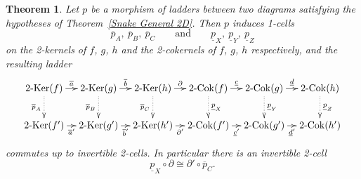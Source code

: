 \documentclass[reqno,a4paper]{amsart}
\numberwithin{equation}{section}
\theoremstyle{plain}
\newtheorem{theorem}[subsection]{Theorem}
\theoremstyle{definition}
\def\nameit#1{\textrm{#1}~}
\def\thex{\nameit{Theorem}}
\newcommand{\comp}{\circ}
\newcommand{\iso}{\cong}
\newcommand{\ov}[1]{\overline{#1}}
\renewcommand{\1}{\onecat{1}}
\newcommand{\TwoKer}{\ensuremath{2\text{-}\mathrm{Ker}}}
\newcommand{\TwoCoker}{\ensuremath{2\text{-}\mathrm{Cok}}}
\begin{document}
\begin{theorem}\label{T:NaturalSnake}
	Let \(p\) be a morphism of ladders between two diagrams satisfying the hypotheses of \thex\ref{Snake General 2D}. Then \(p\) induces 1-cells
	\[
		\ov{p}_A,\ \ov{p}_B,\ \ov{p}_C
		\qquad\text{and}\qquad
		\underline{p}_X,\ \underline{p}_Y,\ \underline{p}_Z
	\]
	on the 2-kernels of \(f\), \(g\), \(h\) and the 2-cokernels of \(f\), \(g\), \(h\) respectively, and the resulting ladder
	\begin{equation*}
		\xymatrix@R=5ex@C=0.9em{
		\TwoKer({f}) \ar@{.>}[d]_-{\ov{p}_A} \ar[r]^-{\ov{a}} &
		\TwoKer({g}) \ar@{.>}[d]_-{\ov{p}_B} \ar[r]^-{\ov{b}} &
		\TwoKer({h}) \ar@{.>}[d]_-{\ov{p}_C} \ar[r]^-{\partial} &
		\TwoCoker({f})\ar@{.>}[d]^-{\underline{p}_X} \ar[r]^-{\underline{c}} &
		\TwoCoker({g}) \ar@{.>}[d]^-{\underline{p}_Y} \ar[r]^-{\underline{d}} &
		\TwoCoker({h}) \ar@{.>}[d]^-{\underline{p}_Z}\\
		\TwoKer({f}') \ar[r]_-{\ov{a}'} &
		\TwoKer({g}') \ar[r]_-{\ov{b}'} &
		\TwoKer({h}') \ar[r]_-{\partial'} &
		\TwoCoker({f}') \ar[r]_-{\underline{c}'} &
		\TwoCoker({g}') \ar[r]_-{\underline{d}'} &
		\TwoCoker({h}')
		}
	\end{equation*}
	commutes up to invertible 2-cells. In particular there is an invertible 2-cell
	\[
		\underline{p}_X\comp\partial\iso\partial'\comp\ov{p}_C\text{.}
	\]
\end{theorem}
\end{document}
